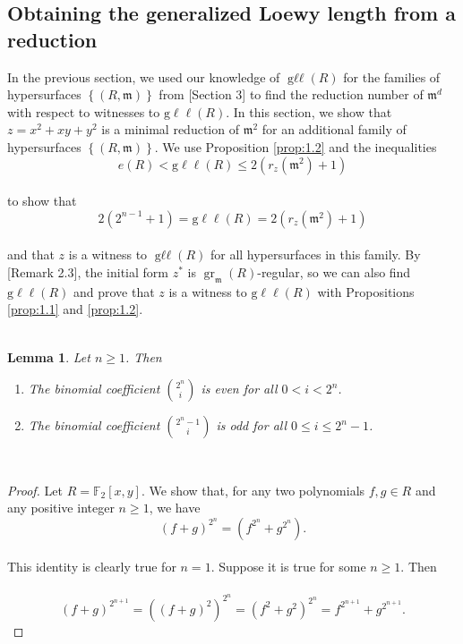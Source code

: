 \documentclass{amsart}
\newtheorem{lemma}[theorem]{Lemma}
\theoremstyle{definition}
\theoremstyle{definition}
\numberwithin{equation}{section}
\theoremstyle{definition}
\DeclareMathOperator{\Gll}{g\ell\ell}
\DeclareMathOperator{\Gr}{gr}
\begin{document}
{\begin{center}
\section{Obtaining the generalized Loewy length from a reduction}
\end{center} \text{}
In the previous section, we used our knowledge of $\Gll(R)$ for the families of hypersurfaces $\left\{(R,\mathfrak{m}) \right\}$ from \cite{Bartels24}[Section 3] to find the reduction number of $\mathfrak{m}^d$ with respect to witnesses to $\text{g}\ell\ell(R)$. In this section, we show that $z=x^2+xy+y^2$ is a minimal reduction of $\mathfrak{m}^2$ for an additional family of hypersurfaces $\left\{(R,\mathfrak{m}) \right\}$. We use Proposition \ref{prop:1.2} and the inequalities\\
\[
e(R)<\text{g}\ell\ell(R) \leq 2 \left( r_{z}(\mathfrak{m}^2) + 1\right)
\] \text{}\\ to show that 
\[
2(2^{n-1}+1)=\text{g}\ell\ell(R)=2 \left(r_{z}(\mathfrak{m}^2) + 1 \right)
\] \text{}\\ and that $z$ is a witness to $\Gll(R)$ for all hypersurfaces in this family. By \cite{De Stefani16}[Remark 2.3], the initial form $z^*$ is $\Gr_{\mathfrak{m}}(R)$-regular, so we can also find $\text{g}\ell\ell(R)$ and prove that $z$ is a witness to $\text{g}\ell\ell(R)$ with Propositions \ref{prop:1.1} and \ref{prop:1.2}.
\text{}\\\\
\begin{lemma}\label{lemma:3.1}
Let $n \geq 1$. Then \\
\begin{enumerate}
\item[(a)] The binomial coefficient $\binom{2^n}{i}$ is even for all $0 < i< 2^n$.\\
\item[(b)] The binomial coefficient $\binom{2^n-1}{i}$ is odd for all $0 \leq i \leq 2^n -1$.
\end{enumerate}
\end{lemma}
\text{}\\
\begin{proof}
Let $R=\mathbb{F}_2[x,y]$. We show that, for any two polynomials $f, g \in R$ and any positive integer $n \geq 1$, we have 
\[
(f+g)^{2^n}=(f^{2^n}+g^{2^n}).
\] \text{}\\ This identity is clearly true for $n=1$. Suppose it is true for some $n \geq 1$. Then \\\\
\[
(f+g)^{2^{n+1}}={\left((f+g)^{2} \right)}^{2^n} = {(f^2 + g^2)}^{2^n}=f^{2^{n+1}}+g^{2^{n+1}}.
\]
\end{proof}}
\end{document}

